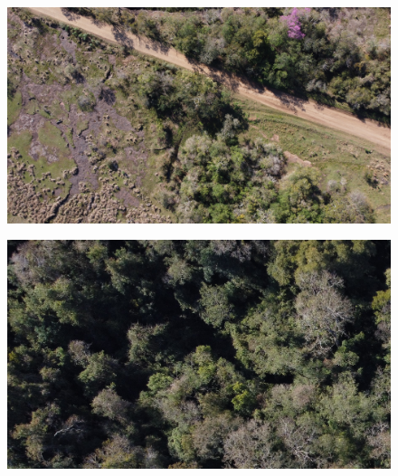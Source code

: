 \begin{figure}
    \includegraphics[width=\textwidth]{Imagenes/street.jpg}
     \hfill
    \label{street}
\end{figure}
\begin{figure}
    \includegraphics[width=\textwidth]{Imagenes/dense canopy.jpg}
     \hfill
    \label{dense}
\end{figure}
